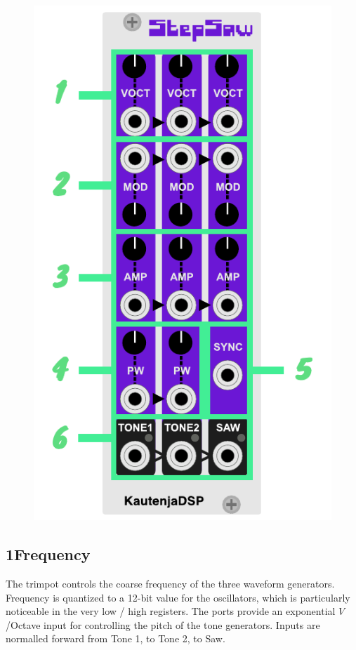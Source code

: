 \documentclass[12pt,letter]{article}
\begin{document}
\begin{figure}[!htp]
\centering
\includegraphics{Interface}
\end{figure}

\subsection*{1{\quad}Frequency}

The trimpot controls the coarse frequency of the three waveform generators. Frequency is quantized to a 12-bit value for the oscillators, which is particularly noticeable in the very low / high registers. The ports provide an exponential $V$/Octave input for controlling the pitch of the tone generators. Inputs are normalled forward from Tone 1, to Tone 2, to Saw.
\end{document}
